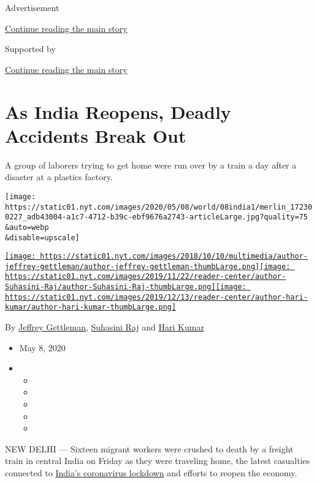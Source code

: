 Advertisement

\protect\hyperlink{after-top}{Continue reading the main story}

Supported by

\protect\hyperlink{after-sponsor}{Continue reading the main story}

\hypertarget{as-india-reopens-deadly-accidents-break-out}{%
\section{As India Reopens, Deadly Accidents Break
Out}\label{as-india-reopens-deadly-accidents-break-out}}

A group of laborers trying to get home were run over by a train a day
after a disaster at a plastics factory.

\texttt{[image: https://static01.nyt.com/images/2020/05/08/world/08india1/merlin\_172300227\_adb43004-a1c7-4712-b39c-ebf9676a2743-articleLarge.jpg?quality=75\\\&auto=webp\\\&disable=upscale]}

\href{https://www.nytimes.com/by/jeffrey-gettleman}{\texttt{[image: https://static01.nyt.com/images/2018/10/10/multimedia/author-jeffrey-gettleman/author-jeffrey-gettleman-thumbLarge.png]}}\href{https://www.nytimes.com/by/suhasini-raj}{\texttt{[image: https://static01.nyt.com/images/2019/11/22/reader-center/author-Suhasini-Raj/author-Suhasini-Raj-thumbLarge.png]}}\href{https://www.nytimes.com/by/hari-kumar}{\texttt{[image: https://static01.nyt.com/images/2019/12/13/reader-center/author-hari-kumar/author-hari-kumar-thumbLarge.png]}}

By \href{https://www.nytimes.com/by/jeffrey-gettleman}{Jeffrey
Gettleman}, \href{https://www.nytimes.com/by/suhasini-raj}{Suhasini Raj}
and \href{https://www.nytimes.com/by/hari-kumar}{Hari Kumar}

\begin{itemize}
\item
  May 8, 2020
\item
  \begin{itemize}
  \item
  \item
  \item
  \item
  \item
  \end{itemize}
\end{itemize}

NEW DELHI --- Sixteen migrant workers were crushed to death by a freight
train in central India on Friday as they were traveling home, the latest
casualties connected to
\href{https://www.nytimes.com/2020/04/19/world/asia/india-coronavirus-lockdown.html}{India's
coronavirus lockdown} and efforts to reopen the economy.

